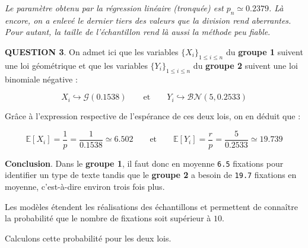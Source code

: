 \documentclass[a4paper,11pt]{article}
\newcommand{\quest}[1]{\small\textbf{#1}\normalsize}
\theoremstyle{nonumberplain}
\theoremstyle{nonumberplain}
\theoremstyle{nonumberplain}
\theoremstyle{nonumberplain}
\begin{document}
      \begin{commentaire}
          \hspace{-1ex}\emph{Le paramètre obtenu par la régression linéaire (tronquée) est $p_n \simeq 0.2379$.
          Là encore, on a enlevé le dernier tiers des valeurs que la division rend aberrantes.
          Pour autant, la taille de l'échantillon rend là aussi la méthode peu fiable}.
      \end{commentaire}

      \newpage\quest{QUESTION 3}. On admet ici
      que les variables ${\{X_i\}}_{1 \le i \le n}$ du \textbf{groupe 1} suivent une loi
      géométrique et que les variables ${\{Y_i\}}_{1 \le i \le n}$ du \textbf{groupe 2} suivent une loi binomiale négative :

      \[
            X_i \hookrightarrow \mathcal{G}(0.1538) \qquad\text{et}\qquad Y_i \hookrightarrow \mathcal{BN}(5, 0.2533)
      \]

      \bigskip
      Grâce à l'expression respective de l'espérance de ces deux lois, on en déduit que :

      \[
            \mathbb{E}[X_i] = \frac{1}{p} = \frac{1}{0.1538} \simeq 6.502 \qquad\text{et}\qquad \mathbb{E}[Y_i] = \frac{r}{p} = \frac{5}{0.2533} \simeq 19.739
      \]

      \bigskip
      \textbf{Conclusion}. \newline
      Dans le \textbf{groupe 1}, il faut donc en moyenne \texttt{6.5} fixations pour identifier
      un type de texte tandis que le \textbf{groupe 2} a besoin de \texttt{19.7} fixations en moyenne, c'est-à-dire
      environ trois fois plus.

      \medskip
      Les modèles étendent les réalisations des échantillons et permettent de
      connaître la probabilité que le nombre de fixations soit supérieur à $10$.

      \medskip
      Calculons cette probabilité pour les deux lois.
\end{document}
